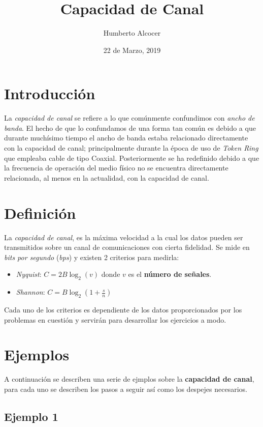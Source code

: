 \documentclass{article}
\title{Capacidad de Canal}
\author{Humberto Alcocer}
\date{22 de Marzo, 2019}
\begin{document}
\maketitle

\section{Introducción}

La \textit{capacidad de canal} se refiere a lo que comúnmente confundimos con \textit{ancho de banda}.
El hecho de que lo confundamos de una forma tan común es debido a que durante muchísimo tiempo el ancho de banda estaba relacionado directamente con la capacidad de canal; principalmente durante la época de uso de \textit{Token Ring} que empleaba cable de tipo Coaxial. Posteriormente se ha redefinido debido a que la frecuencia de operación del medio físico no se encuentra directamente relacionada, al menos en la actualidad, con la capacidad de canal.

\section{Definición}

La \textit{capacidad de canal}, es la máxima velocidad a la cual los datos pueden ser transmitidos sobre un canal de comunicaciones con cierta fidelidad. Se mide en \textit{bits por segundo} (\textit{bps}) y existen 2 criterios para medirla:

\begin{itemize}
  \item \textit{Nyquist}: $C = 2B\log_{2}(v)$ donde $v$ es el \textbf{número de señales}.
  \item \textit{Shannon}: $C = B\log_{2}(1+\frac{s}{n})$
\end{itemize}

Cada uno de los criterios es dependiente de los datos proporcionados por los problemas en cuestión y servirán para desarrollar los ejercicios a modo.

\section{Ejemplos}

A continuación se describen una serie de ejmplos sobre la \textbf{capacidad de canal}, para cada uno se describen los pasos a seguir así como los despejes necesarios.

\subsection{Ejemplo 1}
\end{document}
